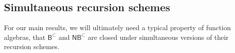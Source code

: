 \documentclass[manuscript,screen]{acmart}
\renewcommand{\emptyset}{\varnothing}
\theoremstyle{definition}
\theoremstyle{remark}
\newcommand{\permpref}{\subset}
\renewcommand{\succ}[1]{\mathsf{s}_{#1}}
\newcommand{\pred}{\mathsf{p}}
\newcommand{\safenesrec}{\mathsf{snrec}}
\newcommand{\snrec}{\safenesrec}
\newcommand{\safenesrecwfpo}[1]{\safenesrec_{#1}}
\newcommand{\snrecwfpo}[1]{\safenesrecwfpo{#1}}
\newcommand{\snrecpp}{\snrecwfpo{\permpref}}
\newcommand{\bc}{\mathsf{B}}
\newcommand{\bcwfpo}[1]{\bc^{#1}}
\newcommand{\nested}{\mathsf{N}}
\newcommand{\nbc}{\nested\bc}
\newcommand{\nbcwfpo}[1]{\nested\bcwfpo{#1}}
\newcommand{\shallow}{\mathsf{S}}
\newcommand{\sbc}{\shallow\bc}
\newcommand{\sbcwfpo}[1]{\sbc^{#1}}
\newcommand{\bcpp}{\bcwfpo{\permpref}}
\newcommand{\nbcpp}{\nbcwfpo{\permpref}}
\newcommand{\sbcpp}{\sbcwfpo\permpref}
\begin{document}


\subsection{Simultaneous recursion schemes}
For our main results, we will ultimately need a typical property of function algebras, that $\bcpp$ and $\nbcpp$ are closed under simultaneous versions of their recursion schemes.
\end{document}
